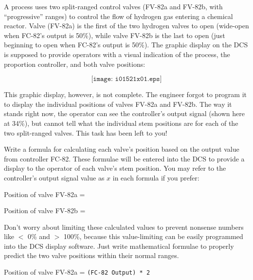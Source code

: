 

A process uses two split-ranged control valves (FV-82a and FV-82b, with ``progressive'' ranges) to control the flow of hydrogen gas entering a chemical reactor.  Valve (FV-82a) is the first of the two hydrogen valves to open (wide-open when FC-82's output is 50\%), while valve FV-82b is the last to open (just beginning to open when FC-82's output is 50\%).  The graphic display on the DCS is supposed to provide operators with a visual indication of the process, the proportion controller, and both valve positions:

$$\texttt{[image: i01521x01.eps]}$$

This graphic display, however, is not complete.  The engineer forgot to program it to display the individual positions of valves FV-82a and FV-82b.  The way it stands right now, the operator can see the controller's output signal (shown here at 34\%), but cannot tell what the individual stem positions are for each of the two split-ranged valves.  This task has been left to you!

\vskip 10pt

Write a formula for calculating each valve's position based on the output value from controller FC-82.  These formulae will be entered into the DCS to provide a display to the operator of each valve's stem position.  You may refer to the controller's output signal value as $x$ in each formula if you prefer:

\vskip 10pt

Position of valve FV-82a = 

\vskip 10pt

Position of valve FV-82b = 

\vskip 10pt

Don't worry about limiting these calculated values to prevent nonsense numbers like $<$ 0\% and $>$ 100\%, because this value-limiting can be easily programmed into the DCS display software.  Just write mathematical formulae to properly predict the two valve positions within their normal ranges.







Position of valve FV-82a = {\tt (FC-82 Output) * 2}

